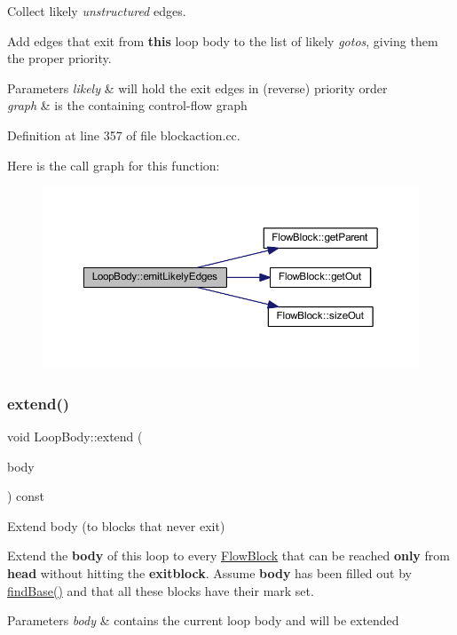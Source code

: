 Collect likely {\itshape unstructured} edges. 

Add edges that exit from {\bfseries{this}} loop body to the list of likely {\itshape gotos}, giving them the proper priority. 
\begin{DoxyParams}{Parameters}
{\em likely} & will hold the exit edges in (reverse) priority order \\
\hline
{\em graph} & is the containing control-\/flow graph \\
\hline
\end{DoxyParams}


Definition at line 357 of file blockaction.\+cc.

Here is the call graph for this function\+:
\nopagebreak
\begin{figure}[H]
\begin{center}
\leavevmode
\includegraphics[width=350pt]{class_loop_body_ab172e6e4e585fe12494548b642e000fc_cgraph}
\end{center}
\end{figure}
\mbox{\label{class_loop_body_add1dd57bc541e2a76e7874017721fd48}} 
\subsubsection{\texorpdfstring{extend()}{extend()}}
{\footnotesize\ttfamily void Loop\+Body\+::extend (\begin{DoxyParamCaption}\item[{vector$<$ \mbox{\hyperlink{class_flow_block}{Flow\+Block}} $\ast$ $>$ \&}]{body }\end{DoxyParamCaption}) const}



Extend body (to blocks that never exit) 

Extend the {\bfseries{body}} of this loop to every \mbox{\hyperlink{class_flow_block}{Flow\+Block}} that can be reached {\bfseries{only}} from {\bfseries{head}} without hitting the {\bfseries{exitblock}}. Assume {\bfseries{body}} has been filled out by \mbox{\hyperlink{class_loop_body_aca6d8a4529165274b791ed9ec37385ef}{find\+Base()}} and that all these blocks have their mark set. 
\begin{DoxyParams}{Parameters}
{\em body} & contains the current loop body and will be extended \\
\hline
\end{DoxyParams}


